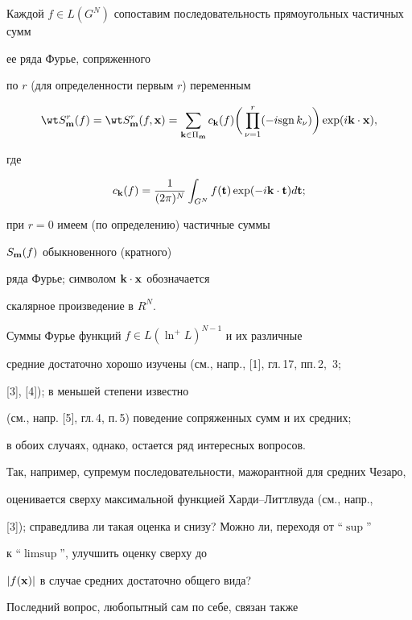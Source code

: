 Каждой $f\in L(G^N)$ сопоставим последовательность прямоугольных частичных сумм


ее ряда Фурье, сопряженного


по $r$ (для определенности первым $r$) переменным


$$


\wt S^r_{\bold m}(f)=\wt S^r_{\bold m} (f,{\bold x})=\sum_{ {\bold k}


\in {\Pi_{\bold m}}} c_{\bold k} (f)


\bigg(\prod_{\nu=1}^r (-i {\sgn k_\nu})\bigg)


\exp (i{\bold k}\cdot{\bold x}),


$$


где 


$$


c_{\bold k} (f) = \frac{1}{(2\pi)^N} \int_{G^N} f({\bold t})


\exp (-i{\bold k}\cdot{\bold t})d{\bold t};


$$ 


при $r=0$ имеем (по определению) частичные суммы


$S_{\bold m}(f) $ обыкновенного (кратного)


ряда Фурье; символом ${\bold k}\cdot{\bold x}$ обозначается


скалярное произведение в $R^N$.





Суммы Фурье функций $f\in L(\ln^+L)^{N-1}$ и их различные


средние достаточно хорошо изучены (см., напр., [1], гл.\,17, пп.\,2,~3;


[3], [4]); в меньшей степени известно


(см., напр. [5], гл.\,4, п.\,5) поведение сопряженных сумм и их средних;


в обоих случаях, однако, остается ряд интересных вопросов.


Так, например, супремум последовательности, мажорантной для средних Чезаро,


оценивается сверху максимальной функцией Харди--Литтлвуда (см., напр.,


[3]); справедлива ли такая оценка и снизу? Можно ли, переходя от ``$\sup$''


к ``$\limsup$'', улучшить оценку сверху до


$|f({\bold x})|$ в случае средних достаточно общего вида?


Последний вопрос, любопытный сам по себе, связан также


